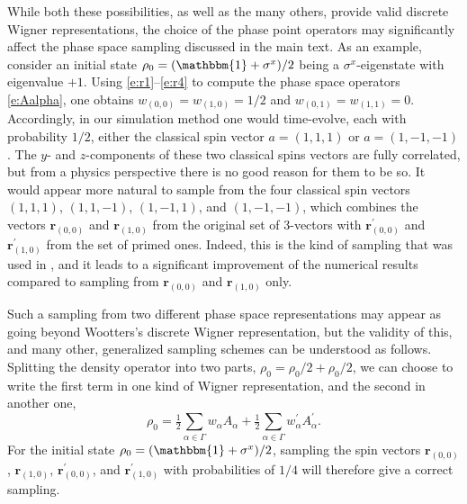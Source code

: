 \documentclass[aps,prl,showpacs,amsmath,amssymb,superscriptaddress,reprint,10pt]{revtex4-1}
\newcommand\id{{\mathbbm{1}}}
\newcommand{\mvec}[1]{\boldsymbol #1}
\begin{document}
While both these possibilities, as well as the many others, provide valid discrete Wigner representations, the choice of the phase point operators may significantly affect the phase space sampling discussed in the main text. As an example, consider an initial state $\rho_0 = (\id+\sigma^x)/2$ being a $\sigma^x$-eigenstate with eigenvalue $+1$. Using \eqref{e:r1}--\eqref{e:r4} to compute the phase space operators \eqref{e:Aalpha}, one obtains $w_{(0,0)}=w_{(1,0)}=1/2$ and 
$w_{(0,1)}=w_{(1,1)}=0$. Accordingly, in our simulation method one would time-evolve, each with probability $1/2$, either the classical spin vector $a=(1,1,1)$ or $a=(1,-1,-1)$. The $y$- and $z$-components of these two classical spins vectors are fully correlated, but from a physics perspective there is no good reason for them to be so. It would appear more natural to sample from the four classical spin vectors $(1,1,1)$, $(1,1,-1)$, $(1,-1,1)$, and $(1,-1,-1)$, which combines the vectors $\mvec{r}_{(0,0)}$ and $\mvec{r}_{(1,0)}$ from the original set of 3-vectors with $\mvec{r}_{(0,0)}^\prime$ and $\mvec{r}_{(1,0)}^\prime$ from the set of primed ones. Indeed, this is the kind of sampling that was used in \cite{Schachenmayer_etal15}, and it leads to a significant improvement of the numerical results compared to sampling from $\mvec{r}_{(0,0)}$ and $\mvec{r}_{(1,0)}$ only.

Such a sampling from two different phase space representations may appear as going beyond Wootters's discrete Wigner representation, but the validity of this, and many other, generalized sampling schemes can be understood as follows. Splitting the density operator into two parts, $\rho_0=\rho_0/2+\rho_0/2$, we can choose to write the first term in one kind of Wigner representation, and the second in another one,
\begin{equation}\label{e:split1}
\rho_0=\tfrac{1}{2}\sum_{\alpha\in\Gamma}w_\alpha A_\alpha + \tfrac{1}{2}\sum_{\alpha\in\Gamma}w_\alpha^\prime A_\alpha^\prime.
\end{equation} 
For the initial state $\rho_0 = (\id+\sigma^x)/2$, sampling the spin vectors $\mvec{r}_{(0,0)}$, $\mvec{r}_{(1,0)}$, $\mvec{r}_{(0,0)}^\prime$, and $\mvec{r}_{(1,0)}^\prime$ with probabilities of $1/4$ will therefore give a correct sampling.
\end{document}
